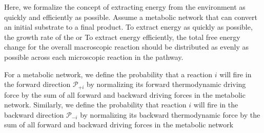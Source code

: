 Here, we formalize the concept of extracting energy from the environment as quickly and efficiently as possible. Assume a metabolic network that can convert an initial substrate to a final product. To extract energy as quickly as possible, the growth rate of the or  To extract energy efficiently, the total free energy change for the overall macroscopic reaction should be distributed as evenly as possible across each microscopic reaction in the pathway.


For a metabolic network, we define the probability that a reaction $i$ will fire in the forward  direction ${\mathcal P_{+i}}$ by normalizing its forward thermodynamic driving force by the sum of all forward and backward driving forces in the metabolic network. Similarly, we define the probability that reaction $i$ will fire in the backward direction $\mathcal P_{-i}$ by normalizing its backward thermodynamic force by  the sum of all forward and backward driving forces in the metabolic network